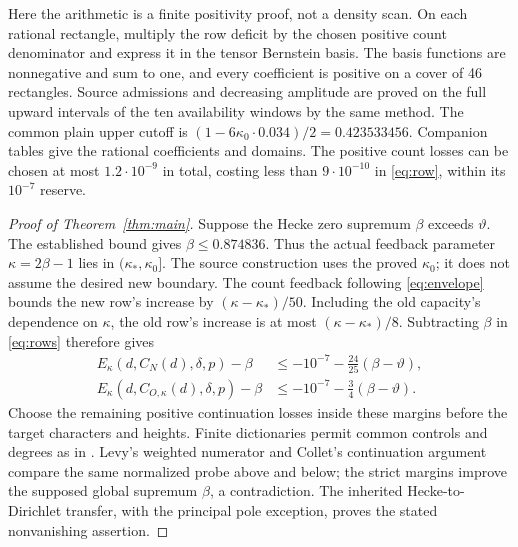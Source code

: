 \documentclass[10pt,a4paper]{article}
\newcommand{\tht}{\vartheta}
\newcommand{\kap}{\kappa}
\begin{document}
Here the arithmetic is a finite positivity proof, not a density scan.
On each rational rectangle, multiply the row deficit by the chosen
positive count denominator and express it in the tensor Bernstein basis.
The basis functions are nonnegative and sum to one, and every coefficient
is positive on a cover of 46 rectangles. Source admissions and decreasing
amplitude are proved on the full upward intervals of the ten availability
windows by the same method. The common plain upper cutoff is
$(1-6\kap_0\cdot0.034)/2=0.423533456$. Companion tables give the rational
coefficients and domains. The positive count losses can be chosen at most
$1.2\cdot10^{-9}$ in total, costing less than $9\cdot10^{-10}$ in
\eqref{eq:row}, within its $10^{-7}$ reserve.

\begin{proof}[Proof of Theorem~\ref{thm:main}]
Suppose the Hecke zero supremum $\beta$ exceeds $\tht$. The established
bound gives $\beta\le0.874836$. Thus the actual feedback parameter
$\kap=2\beta-1$ lies in $(\kap_*,\kap_0]$. The source construction uses
the proved $\kap_0$; it does not assume the desired new boundary.
The count feedback following \eqref{eq:envelope} bounds the new row's
increase by $(\kap-\kap_*)/50$. Including the old capacity's dependence
on $\kap$, the old row's increase is at most $(\kap-\kap_*)/8$.
Subtracting $\beta$ in \eqref{eq:rows} therefore gives
\begin{align*}
 E_\kap(d,C_N(d),\delta,p)-\beta
      &\le-10^{-7}-\tfrac{24}{25}(\beta-\tht),\\
 E_\kap(d,C_{O,\kap}(d),\delta,p)-\beta
      &\le-10^{-7}-\tfrac34(\beta-\tht).
\end{align*}
Choose the remaining positive continuation losses inside these margins
before the target characters and heights. Finite dictionaries permit
common controls and degrees as in \cite{detector}. Levy's weighted
numerator and Collet's continuation argument \cite{levy,collet} compare
the same normalized probe above and below; the strict margins improve
the supposed global supremum $\beta$, a contradiction. The inherited
Hecke-to-Dirichlet transfer, with the principal pole exception, proves
the stated nonvanishing assertion.
\end{proof}
\end{document}
